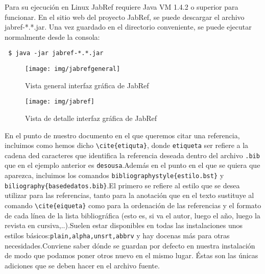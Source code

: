 Para su ejecución en Linux JabRef requiere Java VM 1.4.2 o superior para funcionar. En el sitio web del proyecto JabRef, se puede descargar el archivo jabref-*.*.jar. Una vez guardado en el directorio conveniente, se puede ejecutar normalmente desde la consola: 

\begin{verbatim}
 $ java -jar jabref-*.*.jar
\end{verbatim}

\begin{figure}[h]
\begin{center}
 \texttt{[image: img/jabrefgeneral]}
\end{center}
\caption{Vista general interfaz gráfica de JabRef}
\end{figure}


\begin{figure}[h]
\begin{center}
 \texttt{[image: img/jabref]}
\end{center}
\caption{Vista de detalle interfaz gráfica de JabRef}
\end{figure}


En el punto de nuestro documento  en el que queremos citar una referencia, incluimos como hemos dicho \verb|\cite{etiquta}|, donde \verb|etiqueta|  ser refiere a la cadena ded caracteres que identifica la referencia deseada dentro del archivo \verb|.bib| que en el ejemplo anterior es \verb|desousa|.Además en el punto en el que se quiera que aparezca, incluimos los comandos \verb|bibliographystyle{estilo.bst}| y \verb|biliography{basededatos.bib}|.El primero se refiere al estilo que se desea utilizar para las referencias, tanto para la anotación que en el texto sustituye al comando \verb|\cite{eiqueta}| como para la ordenación de las referencias y el formato  de cada línea de la lista bibliográfica (esto es, si va el autor, luego el año, luego la revista en cursiva,..).Suelen estar disponibles en todas las instalaciones unos estilos básicos:\verb|plain,alpha,unsrt,abbrv| y hay docenas más para otras necesidades.Conviene saber dónde se guardan por defecto en nuestra instalación de modo que podamos poner otros nuevo en el mismo lugar. Éstas son las únicas adiciones que se deben hacer en el archivo fuente.

